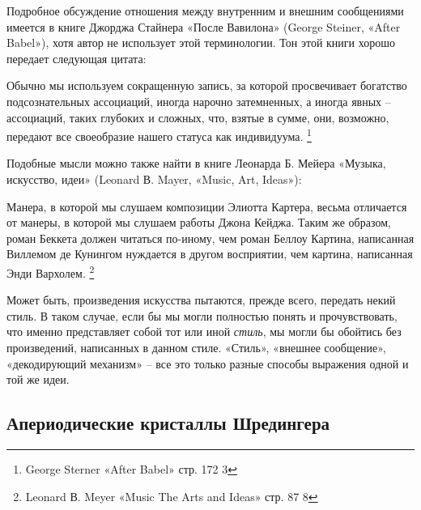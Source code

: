 \documentclass[../main.tex]{subfiles}
\begin{document}
Подробное обсуждение отношения между внутренним и внешним сообщениями имеется в книге Джорджа Стайнера «После Вавилона» (George Steiner, «After Babel»), хотя автор не использует этой терминологии. Тон этой книги хорошо передает следующая цитата:

Обычно мы используем сокращенную запись, за которой просвечивает богатство подсознательных ассоциаций, иногда нарочно затемненных, а иногда явных \--- ассоциаций, таких глубоких и сложных, что, взятые в сумме, они, возможно, передают все своеобразие нашего статуса как индивидуума. \footnote{George Sterner «After Babel» стр. 172 3}

Подобные мысли можно также найти в книге Леонарда Б. Мейера «Музыка, искусство, идеи» (Leonard В. Mayer, «Music, Art, Ideas»):

Манера, в которой мы слушаем композиции Элиотта Картера, весьма отличается от манеры, в которой мы слушаем работы Джона Кейджа. Таким же образом, роман Беккета должен читаться по-иному, чем роман Беллоу Картина, написанная Виллемом де Кунингом нуждается в другом восприятии, чем картина, написанная Энди Вархолем. \footnote{Leonard В. Meyer «Music The Arts and Ideas» стр. 87 8}

Может быть, произведения искусства пытаются, прежде всего, передать некий стиль. В таком случае, если бы мы могли полностью понять и прочувствовать, что именно представляет собой тот или иной \emph{стиль}, мы могли бы обойтись без произведений, написанных в данном стиле. «Стиль», «внешнее сообщение», «декодирующий механизм» \--- все это только разные способы выражения одной и той же идеи.


\subsection{Апериодические кристаллы Шредингера}
\end{document}

